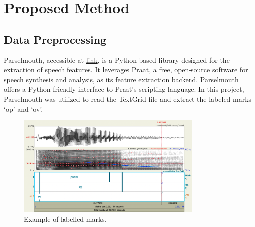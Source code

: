 \documentclass{article}
\begin{document}
\section{Proposed Method}
\subsection{Data Preprocessing}
\begin{sloppypar}
Parselmouth, accessible at \href{https://parselmouth.readthedocs.io/en/stable/}{link}, is a Python-based library designed for the extraction of speech features. It leverages Praat, a free, open-source software for speech synthesis and analysis, as its feature extraction backend. Parselmouth offers a Python-friendly interface to Praat's scripting language. In this project, Parselmouth was utilized to read the TextGrid file and extract the labeled marks `op' and `ov'.
\end{sloppypar}
\begin{figure}[H]
    \centering
    \includegraphics[width=0.8\textwidth]{img/phoneme_example.png}
    \caption{Example of labelled marks.}
\end{figure}
\end{document}
